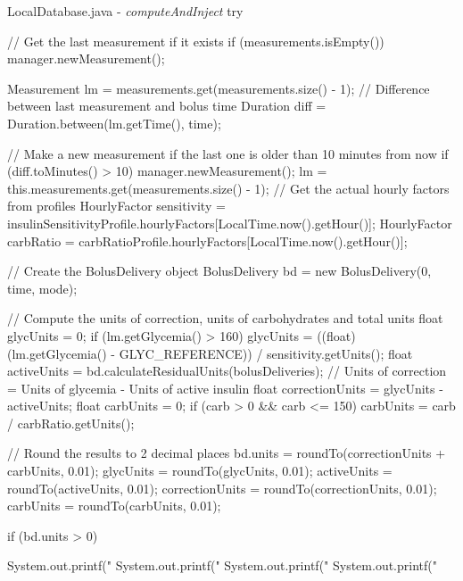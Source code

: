 \begin{javaCode}{LocalDatabase.java - \textit{computeAndInject}}
try {
    // Get the last measurement if it exists
    if (measurements.isEmpty())
        manager.newMeasurement();

    Measurement lm = measurements.get(measurements.size() - 1);
    // Difference between last measurement and bolus time
    Duration diff = Duration.between(lm.getTime(), time);

    // Make a new measurement if the last one is older than 10 minutes from now
    if (diff.toMinutes() > 10) {
        manager.newMeasurement();
        lm = this.measurements.get(measurements.size() - 1);
    }
    // Get the actual hourly factors from profiles
    HourlyFactor sensitivity = insulinSensitivityProfile.hourlyFactors[LocalTime.now().getHour()];
    HourlyFactor carbRatio = carbRatioProfile.hourlyFactors[LocalTime.now().getHour()];

    // Create the BolusDelivery object
    BolusDelivery bd = new BolusDelivery(0, time, mode);

    // Compute the units of correction, units of carbohydrates and total units
    float glycUnits = 0;
    if (lm.getGlycemia() > 160)
        glycUnits = ((float) (lm.getGlycemia() - GLYC_REFERENCE)) / sensitivity.getUnits();
    float activeUnits = bd.calculateResidualUnits(bolusDeliveries);
    // Units of correction = Units of glycemia - Units of active insulin
    float correctionUnits = glycUnits - activeUnits;
    float carbUnits = 0;
    if (carb > 0 && carb <= 150)
        carbUnits = carb / carbRatio.getUnits();

    // Round the results to 2 decimal places
    bd.units = roundTo(correctionUnits + carbUnits, 0.01);
    glycUnits = roundTo(glycUnits, 0.01);
    activeUnits = roundTo(activeUnits, 0.01);
    correctionUnits = roundTo(correctionUnits, 0.01);
    carbUnits = roundTo(carbUnits, 0.01);

    if (bd.units > 0) {
        System.out.printf("%
        System.out.printf("%
        System.out.printf("%
        System.out.printf("%

}}
\end{javaCode}
